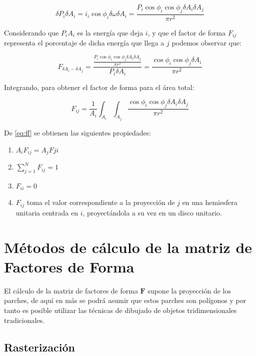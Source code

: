 \begin{equation}
    \delta{P}_{i}\delta{A_{i}} = i_{i} \cos{\phi_{i}}\delta{\omega}\delta{A_{i}} = \frac{P_{i}\cos{\phi_{i}}\cos{\phi_{j}}\delta{A_{i}}\delta{A_{j}}}{\pi r^{2}}
\end{equation}

Considerando que ${P}_{i}{A_{i}}$ es la energía que deja $i$, y que el factor de forma $F_{ij}$ representa el porcentaje
de dicha energía que llega a $j$ podemos observar que:

\begin{equation}
    F_{\delta{A_{i}}-\delta{A_{j}}} = \frac{\frac{P_{i}\cos{\phi_{i}}\cos{\phi_{j}}\delta{A_{i}}\delta{A_{j}}}{\pi r^{2}}}{P_{i}\delta{A_{i}}} = \frac{\cos{\phi_{i}}\cos{\phi_{j}}\delta{A_{i}}}{\pi{r^{2}}}
\end{equation}

Integrando, para obtener el factor de forma para el área total:

\begin{equation}
    F_{ij} = \frac{1}{A_{i}} \int_{A_{i}}\int_{A_{j}}\frac{\cos{\phi_{i}}\cos{\phi_{j}}\delta{A_{i}}\delta{A_{j}}}{\pi{r^{2}}} \label{eq:ff}    
\end{equation}

De \eqref{eq:ff} se obtienen las siguientes propiedades:
\begin{enumerate}
	\label{propsff}
    \item $A_{i}F_{ij} = A_{j}F{ji}$
    \item $\sum_{j=1}^{N} F_{ij} = 1$
    \item $F_{ii} = 0$
    \item $F_{ij}$ toma el valor correspondiente a la proyección de $j$ en una hemiesfera unitaria centrada en $i$, proyectándola a su vez en un disco unitario.
\end{enumerate}

\section{Métodos de cálculo de la matriz de Factores de Forma}
\label{sec:calculoff}

El cálculo de la matriz de factores de forma $\mathbf{F}$ supone la proyección de los parches, de aquí en más se podrá asumir que estos parches son polígonos y por tanto es posible utilizar las técnicas de dibujado de objetos tridimensionales tradicionales.

\subsection{Rasterización}

